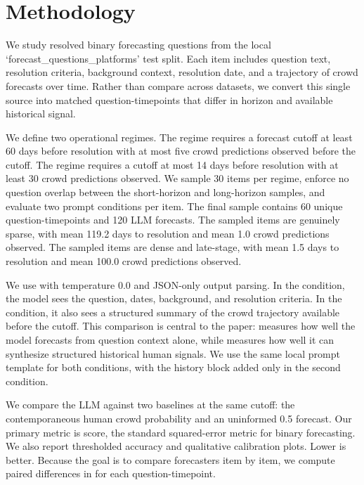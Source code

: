 \section{Methodology}
\label{sec:methodology}

 We study resolved binary forecasting questions from the local `forecast\_questions\_platforms' test split. Each item includes question text, resolution criteria, background context, resolution date, and a trajectory of crowd forecasts over time. Rather than compare across datasets, we convert this single source into matched question-timepoints that differ in horizon and available historical signal.

 We define two operational regimes. The \longterm regime requires a forecast cutoff at least 60 days before resolution with at most five crowd predictions observed before the cutoff. The \shortterm regime requires a cutoff at most 14 days before resolution with at least 30 crowd predictions observed. We sample 30 items per regime, enforce no question overlap between the short-horizon and long-horizon samples, and evaluate two prompt conditions per item. The final sample contains 60 unique question-timepoints and 120 LLM forecasts. The sampled \longterm items are genuinely sparse, with mean 119.2 days to resolution and mean 1.0 crowd predictions observed. The sampled \shortterm items are dense and late-stage, with mean 1.5 days to resolution and mean 100.0 crowd predictions observed.

 We use \gptmodel with temperature 0.0 and JSON-only output parsing. In the \questiononly condition, the model sees the question, dates, background, and resolution criteria. In the \withhistory condition, it also sees a structured summary of the crowd trajectory available before the cutoff. This comparison is central to the paper: \questiononly measures how well the model forecasts from question context alone, while \withhistory measures how well it can synthesize structured historical human signals. We use the same local prompt template for both conditions, with the history block added only in the second condition.

 We compare the LLM against two baselines at the same cutoff: the contemporaneous human crowd probability and an uninformed 0.5 forecast. Our primary metric is \brier score, the standard squared-error metric for binary forecasting. We also report thresholded accuracy and qualitative calibration plots. Lower \brier is better. Because the goal is to compare forecasters item by item, we compute paired differences in \brier for each question-timepoint.

